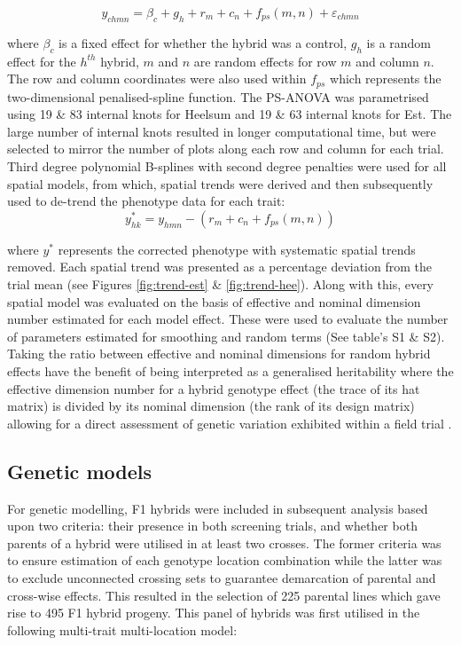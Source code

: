 \begin{refsection}
\begin{equation}
y_{chmn} = \beta_c + g_h + r_m + c_n + f_{ps}(m,n) + \varepsilon_{chmn}
\label{eq:general-spline-model}
\end{equation}

where \(\beta_c\) is a fixed effect for whether the hybrid was a control, \(g_h\) is a random effect for the \(h^{th}\) hybrid, \(m\) and \(n\) are random effects for row \(m\) and column \(n\). The row and column coordinates were also used within \(f_{ps}\) which represents the two-dimensional penalised-spline function. The PS-ANOVA was parametrised using 19 \& 83 internal knots for Heelsum and 19 \& 63 internal knots for Est. The large number of internal knots resulted in longer computational time, but were selected to mirror the number of plots along each row and column for each trial. Third degree polynomial B-splines with second degree penalties were used for all spatial models, from which, spatial trends were derived and then subsequently used to de-trend the phenotype data for each trait:
\begin{equation}
y_{hk}^* = y_{hmn} - \left(r_m + c_n + f_{ps}(m,n) \right)
\label{eq:correct-values}
\end{equation}

where \(y^*\) represents the corrected phenotype with systematic spatial trends removed. Each spatial trend was presented as a percentage deviation from the trial mean (see Figures \ref{fig:trend-est} \& \ref{fig:trend-hee}). Along with this, every spatial model was evaluated on the basis of effective and nominal dimension number estimated for each model effect. These were used to evaluate the number of parameters estimated for smoothing and random terms (See table's S1 \& S2). Taking the ratio between effective and nominal dimensions for random hybrid effects have the benefit of being interpreted as a generalised heritability where the effective dimension number for a hybrid genotype effect (the trace of its hat matrix) is divided by its nominal dimension (the rank of its design matrix) allowing for a direct assessment of genetic variation exhibited within a field trial \parencite{Oakey2006}.

\subsection{Genetic models}\label{genetic-models}

For genetic modelling, F1 hybrids were included in subsequent analysis based upon two criteria: their presence in both screening trials, and whether both parents of a hybrid were utilised in at least two crosses. The former criteria was to ensure estimation of each genotype location combination while the latter was to exclude unconnected crossing sets to guarantee demarcation of parental and cross-wise effects. This resulted in the selection of 225 parental lines which gave rise to 495 F1 hybrid progeny. This panel of hybrids was first utilised in the following multi-trait multi-location model:


\end{refsection}
